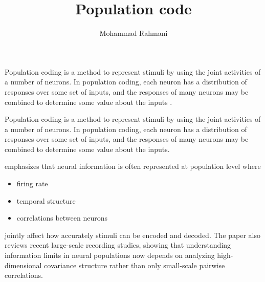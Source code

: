 \documentclass[a4paper]{article}
\title{Population code}
\date{}
\author{Mohammad Rahmani}
\begin{document}
    \maketitle
    Population coding is a method to represent stimuli by using the joint activities of a number of neurons. In population coding, each neuron has a distribution of responses over some set of inputs, and the responses of many neurons may be combined to determine some value about the inputs .
    
    Population coding is a method to represent stimuli by using the joint activities of a number of neurons. In population coding, each neuron has a distribution of responses over some set of inputs, and the responses of many neurons may be combined to determine some value about the inputs.
    
    \cite{shimazaki-2025-neural-coding-foundational-concepts-statistical-formulations-and-recent-advances} emphasizes that neural information is often represented at population level where
    
    \begin{itemize}
        \item firing rate
        \item temporal structure
        \item correlations between neurons
    \end{itemize}
    jointly affect how accurately stimuli can be encoded and decoded. The paper also reviews recent large-scale recording studies, showing that understanding information limits in neural populations now depends on analyzing high-dimensional covariance structure rather than only small-scale pairwise correlations.
    \cite{shimazaki-2025-neural-coding-foundational-concepts-statistical-formulations-and-recent-advances}
    
    
\end{document}

